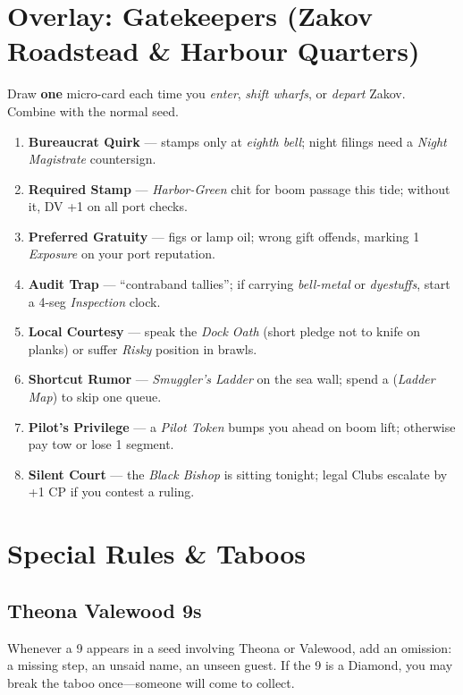 \section{Overlay: Gatekeepers (Zakov Roadstead \& Harbour Quarters)}
Draw \textbf{one} micro-card each time you \emph{enter}, \emph{shift wharfs}, or \emph{depart} Zakov. Combine with the normal seed.

\begin{tcolorbox}[enhanced,breakable,sharp corners,boxrule=.6pt,title={Zakov Gatekeepers Micro-Cards (draw 1)}]
\begin{enumerate}[label=\arabic*.]
  \item \textbf{Bureaucrat Quirk} — stamps only at \emph{eighth bell}; night filings need a \emph{Night Magistrate} countersign.
  \item \textbf{Required Stamp} — \emph{Harbor-Green} chit for boom passage this tide; without it, DV +1 on all port checks.
  \item \textbf{Preferred Gratuity} — figs or lamp oil; wrong gift offends, marking 1 \emph{Exposure} on your port reputation.
  \item \textbf{Audit Trap} — ``contraband tallies''; if carrying \emph{bell-metal} or \emph{dyestuffs}, start a 4-seg \emph{Inspection} clock.
  \item \textbf{Local Courtesy} — speak the \emph{Dock Oath} (short pledge not to knife on planks) or suffer \emph{Risky} position in brawls.
  \item \textbf{Shortcut Rumor} — \emph{Smuggler's Ladder} on the sea wall; spend a \SuitDiamond{} (\emph{Ladder Map}) to skip one queue.
  \item \textbf{Pilot's Privilege} — a \emph{Pilot Token} bumps you ahead on boom lift; otherwise pay tow or lose 1 segment.
  \item \textbf{Silent Court} — the \emph{Black Bishop} is sitting tonight; legal Clubs escalate by +1 CP if you contest a ruling.
\end{enumerate}
\end{tcolorbox}

\section{Special Rules \& Taboos}

\subsection{Theona Valewood 9s}
Whenever a 9 appears in a seed involving Theona or Valewood, add an omission: a missing step, an unsaid name, an unseen guest. If the 9 is a Diamond, you may break the taboo once---someone will come to collect.

